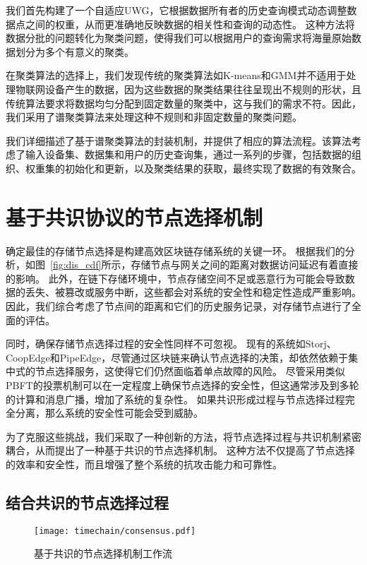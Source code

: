 我们首先构建了一个自适应UWG，它根据数据所有者的历史查询模式动态调整数据点之间的权重，从而更准确地反映数据的相关性和查询的动态性。
这种方法将数据分批的问题转化为聚类问题，使得我们可以根据用户的查询需求将海量原始数据划分为多个有意义的聚类。

在聚类算法的选择上，我们发现传统的聚类算法如K-means和GMM并不适用于处理物联网设备产生的数据，因为这些数据的聚类结果往往呈现出不规则的形状，且传统算法要求将数据均匀分配到固定数量的聚类中，这与我们的需求不符。因此，我们采用了谱聚类算法来处理这种不规则和非固定数量的聚类问题。

我们详细描述了基于谱聚类算法的封装机制，并提供了相应的算法流程。该算法考虑了输入设备集、数据集和用户的历史查询集，通过一系列的步骤，包括数据的组织、权重集的初始化和更新，以及聚类结果的获取，最终实现了数据的有效聚合。

\chapter{基于共识协议的节点选择机制}
\label{sec:consensus}
确定最佳的存储节点选择是构建高效区块链存储系统的关键一环。
根据我们的分析，如图~\autoref{fig:dis_cdf}所示，存储节点与网关之间的距离对数据访问延迟有着直接的影响。
此外，在链下存储环境中，节点存储空间不足或恶意行为可能会导致数据的丢失、被篡改或服务中断，这些都会对系统的安全性和稳定性造成严重影响。
因此，我们综合考虑了节点间的距离和它们的历史服务记录，对存储节点进行了全面的评估。

同时，确保存储节点选择过程的安全性同样不可忽视。
现有的系统如Storj、CoopEdge和PipeEdge，尽管通过区块链来确认节点选择的决策，却依然依赖于集中式的节点选择服务，这使得它们仍然面临着单点故障的风险。
尽管采用类似PBFT的投票机制可以在一定程度上确保节点选择的安全性，但这通常涉及到多轮的计算和消息广播，增加了系统的复杂性。
如果共识形成过程与节点选择过程完全分离，那么系统的安全性可能会受到威胁。

为了克服这些挑战，我们采取了一种创新的方法，将节点选择过程与共识机制紧密耦合，从而提出了一种基于共识的节点选择机制。
这种方法不仅提高了节点选择的效率和安全性，而且增强了整个系统的抗攻击能力和可靠性。

\section{结合共识的节点选择过程}

\begin{figure}[t]
    \centering
    \texttt{[image: timechain/consensus.pdf]}
    \caption{基于共识的节点选择机制工作流}
    \label{fig:consensus}
\end{figure}

